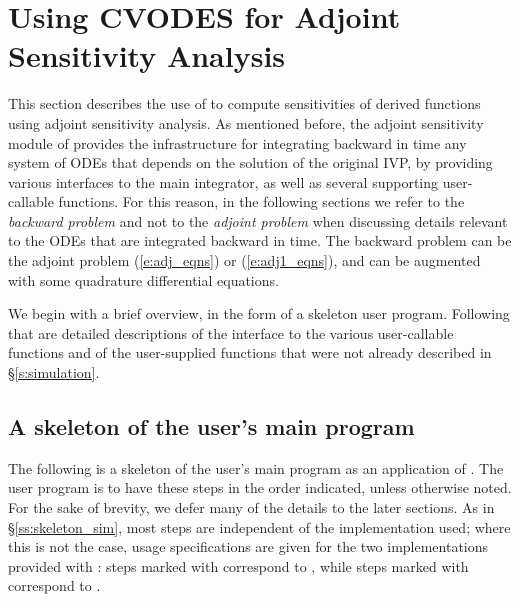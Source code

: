 \chapter{Using CVODES for Adjoint Sensitivity Analysis}\label{s:adjoint}

This section describes the use of {\cvodes} to compute sensitivities of derived 
functions using adjoint sensitivity analysis. As mentioned before, the adjoint
sensitivity module of {\cvodes} provides the infrastructure for integrating
backward in time any system of ODEs that depends on the solution of the original
IVP, by providing various interfaces to the main {\cvodes} integrator, as well 
as several supporting user-callable functions. For this reason, in the following
sections we refer to the {\em backward problem} and not to the 
{\em adjoint problem} when discussing details relevant to the ODEs that
are integrated backward in  time. The backward problem can be the adjoint problem
(\ref{e:adj_eqns}) or (\ref{e:adj1_eqns}), and
can be augmented with some quadrature differential equations.

We begin with a brief overview, in the form of a skeleton user program.
Following that are detailed descriptions of the interface to the
various user-callable functions and of the user-supplied functions that were not already
described in \S\ref{s:simulation}.
\section{A skeleton of the user's main program}\label{ss:skeleton_adj}
The following is a skeleton of the user's main program as an application of
{\cvodes}. The user program is to have these steps in the order indicated, 
unless otherwise noted. For the sake of brevity, we defer many of the details to 
the later sections.
As in \S\ref{ss:skeleton_sim}, most steps are independent of the {\nvector}
implementation used; where this is not the case, usage specifications are given for the
two implementations provided with {\cvodes}: steps marked with {\p} correspond to 
{\nvecp}, while steps marked with {\s} correspond to {\nvecs}.

